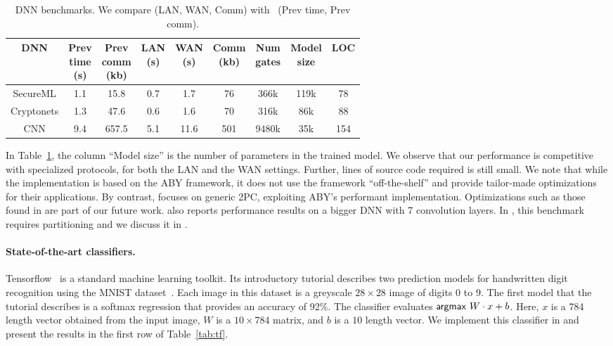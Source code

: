\setlength\tabcolsep{2.5pt}
\begin{table}
\footnotesize
\begin{tabular}{|c|c|c|c |c|c|c|c|c|}
\hline
DNN  & \thead{Prev \\ time\\ (s)} & \thead{Prev \\ comm\\ (kb)} & \thead{LAN  \\ (s)} & \thead{WAN\\ (s)} & \thead{Comm \\(kb)} & \thead{Num \\ gates} & \thead{Model\\ size} & LOC\\
\hline
SecureML   &  1.1 & 15.8 & 0.7 & 1.7  & 76   &   366k   & 119k & 78\\
\hline
Cryptonets &  1.3 & 47.6 & 0.6 & 1.6  & 70    &  316k & 86k & 88\\
\hline
CNN        &  9.4 & 657.5& 5.1 & 11.6 & 501  & 9480k & 35k & 154\\
\hline
\end{tabular}

 \caption{DNN benchmarks. We compare \tool (LAN, WAN, Comm)
 with~\cite{minionn} (Prev time, Prev comm).}
 \label{tab:nn} 
\end{table}


In Table~\ref{tab:nn}, 
the column ``Model size'' is the number of parameters in the
trained model.
We observe that our performance is competitive with specialized
\minion protocols, for both the LAN and the WAN settings. Further, lines
of \tool source code required is still small. 
We note that while the \minion implementation is based on the ABY framework, it does not use the framework ``off-the-shelf'' and provide tailor-made optimizations for their applications. By contrast, \tool focuses on generic
2PC, exploiting ABY's performant implementation. Optimizations such as those found in \minion are part of our future work.
\minion also reports performance results on a bigger DNN with 7
convolution layers. In \tool, this benchmark requires partitioning and
we discuss it in .

\paragraph{State-of-the-art classifiers.}
Tensorflow~\cite{tensorflow} is a standard machine learning toolkit.
Its introductory tutorial describes two prediction models for handwritten digit recognition
using the MNIST dataset~\cite{mnist}.
Each image in this dataset is a greyscale $28\times 28$ image of
digits 0 to 9.
The first model that the tutorial describes is a softmax regression
that provides an accuracy of 92\%. The classifier evaluates
$ \mathsf{argmax}\ W\cdot x+b$.
Here, $x$ is a 784 length vector obtained from the input image,
 $W$ is a $10\times 784$ matrix, and  $b$ is a $10$ length
vector.
We implement this classifier in \tool and present the results in the
first row of Table~\ref{tab:tf}. 


